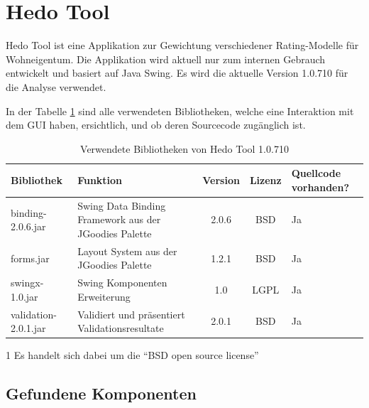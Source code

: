   \section{Hedo Tool}
  
  Hedo Tool ist eine Applikation zur Gewichtung verschiedener Rating-Modelle
  für Wohneigentum. Die Applikation wird aktuell nur zum internen Gebrauch
  entwickelt und basiert auf Java Swing. Es wird die aktuelle Version 1.0.710
  für die Analyse verwendet.
  
  In der Tabelle \ref{tab:bibliothekenHedoTool} sind alle verwendeten
  Bibliotheken, welche eine Interaktion mit dem \ac{GUI} haben, ersichtlich,
  und ob deren Sourcecode zugänglich ist.
  \newline
  
  \begin{table}[ht]
    \sffamily 
    \begin{center}
      \begin{threeparttable}
        \begin{tabular}{lp{4.5cm}ccp{2cm}}
          \toprule
          Bibliothek & Funktion & Version & Lizenz & Quellcode vorhanden?\\
          \midrule
          binding-2.0.6.jar & Swing Data Binding Framework aus der JGoodies
          Palette & 2.0.6 & BSD\tnote{1} & Ja\\
          forms.jar & Layout System aus der JGoodies Palette & 1.2.1 &
          BSD\tnote{1} & Ja\\
          swingx-1.0.jar & Swing Komponenten Erweiterung & 1.0 & LGPL & Ja\\
          validation-2.0.1.jar & Validiert und präsentiert Validationsresultate
          & 2.0.1 & BSD\tnote{1} & Ja\\
          \bottomrule
        \end{tabular}
        \caption{Verwendete Bibliotheken von Hedo Tool 1.0.710}
        \label{tab:bibliothekenHedoTool}
        \begin{tablenotes}[++]\footnotesize 
          \item[1] Es handelt sich dabei um die ``BSD open source license''
        \end{tablenotes} 
      \end{threeparttable}
    \end{center}
  \end{table}
  
  \subsection{Gefundene Komponenten}
  

